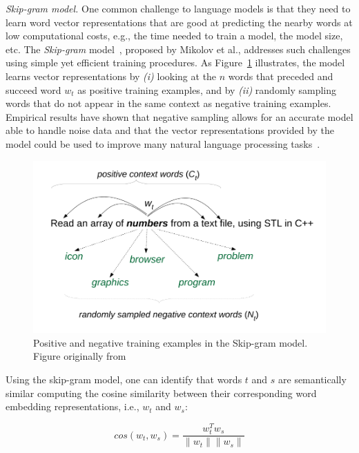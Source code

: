 \smallskip
\begin{hangparas}{.0in}{0}
     \textit{ Skip-gram model.} One common challenge to language models is that they need to learn word vector representations that are good at predicting the nearby words at low computational costs, e.g., the time needed to train a model, the model size, etc.
    The \textit{Skip-gram} model~\cite{Mikolov2013}, proposed by Mikolov et al., addresses such challenges using simple yet efficient training procedures. As Figure~\ref{fig:skip-gram-example} illustrates, the model learns vector representations by \textit{(i)} looking at the $n$ words that preceded and succeed word $w_t$
     as positive training examples, and by \textit{(ii)} randomly sampling words that do not appear in the same context as negative training examples. Empirical results have shown that negative sampling allows for an accurate model able to handle noise data and that 
     the vector representations provided by the model could be used to improve many natural language processing tasks~\cite{mikolov2013efficient}.
\end{hangparas}

\begin{figure}[H]
    \centering
    \includegraphics[width=.65\linewidth]{fig/cp5/ye-skip-gram-example}
    \caption{Positive and negative training examples in the Skip-gram model. Figure originally from~\cite{Ye2016}}
    \label{fig:skip-gram-example}
\end{figure}


Using the skip-gram model, one can identify that words $t$ and $s$ are semantically similar 
computing the cosine similarity between their corresponding word embedding representations, i.e., $w_t$ and $w_s$:



\begin{equation}
    cos(w_t,w_s) = \frac{w_t^Tw_s}{\|w_t\| \|w_s\|}
    \label{eq:word-sim}
\end{equation}




